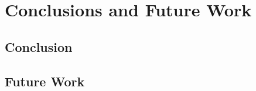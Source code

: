 \documentclass{article}
\begin{document}
\section{Conclusions and Future Work}
\subsection{Conclusion}
\subsection{Future Work}\label{sec:future-work}

\clearpage


\end{document}

